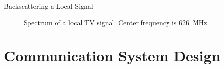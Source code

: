 \documentclass[apectratio=169]{beamer}
\begin{document}
\begin{frame}{Backscattering a Local Signal}
	\begin{figure}[H]	
		\centering
		\caption{Spectrum of a local TV signal. Center frequency is \SI{626}{\mega\Hz}.}
	\end{figure}	
\end{frame}

\section{Communication System Design}
\end{document}
